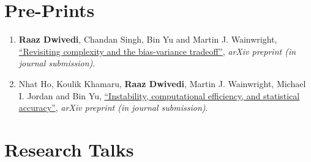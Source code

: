 \documentclass[margin,centered]{res}
\newcommand\quelle[1]{{%
      \unskip\nobreak\hfil\penalty50
      \hskip2em\hbox{}\nobreak\hfil\emph{#1}%
      \parfillskip=0pt \finalhyphendemerits=0 \par}}
\newcommand{\ptitle}[1]{``#1''}
\begin{document}
\begin{resume}
\section{\sc Pre-Prints} 

\begin{enumerate}[label={P\arabic*.},leftmargin=*]
\item \textbf{Raaz Dwivedi}\eqc, {Chandan Singh}\eqc, Bin Yu and Martin
J. Wainwright, \href{https://arxiv.org/abs/2006.10189}{\ptitle{Revisiting complexity and the bias-variance
tradeoff}}, \textit{arXiv preprint (in journal submission)}.
\item Nhat Ho\eqc, Koulik Khamaru\eqc, \textbf{Raaz Dwivedi}\eqc, Martin
J. Wainwright, Michael I. Jordan and Bin Yu,  \href{https://arxiv.org/abs/2005.11411}
{\ptitle{Instability, computational efficiency,
and statistical accuracy}}, \textit{arXiv preprint (in journal submission)}.
\end{enumerate}








\section{\sc Research Talks}

\end{resume}
\end{document}
